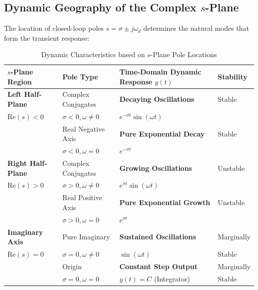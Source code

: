 \documentclass[12pt,onecolumn,twoside ]{article}
\begin{document}
	\subsection{Dynamic Geography of the Complex $s$-Plane}
	The location of closed-loop poles $s = \sigma \pm j\omega_d$ determines the natural modes that form the transient response:

\begin{table}[htbp]
	\centering
	\caption{Dynamic Characteristics based on $s$-Plane Pole Locations}
	\label{tab:s_plane_pole_responses}
	\small
	\renewcommand{\arraystretch}{1.3} %
	\begin{tabularx}{\textwidth}{L{1} L{1.0} L{1.4} L{0.6}}
		\toprule
		\textbf{$s$-Plane Region} & \textbf{Pole Type} & \textbf{Time-Domain Dynamic Response $y(t)$} & \textbf{Stability} \\
		\midrule
		\textbf{Left Half-Plane} & Complex Conjugates & \textbf{Decaying Oscillations} & Stable \\
		$\text{Re}(s) < 0$ & $\sigma < 0, \omega \neq 0$ & $e^{-\sigma t} \sin(\omega t)$ & \\
		\addlinespace[4pt]
		& Real Negative Axis & \textbf{Pure Exponential Decay} & Stable \\
		& $\sigma < 0, \omega = 0$ & $e^{-\sigma t}$ & \\
		\midrule
		\textbf{Right Half-Plane} & Complex Conjugates & \textbf{Growing Oscillations} & Unstable \\
		$\text{Re}(s) > 0$ & $\sigma > 0, \omega \neq 0$ & $e^{\sigma t} \sin(\omega t)$ & \\
		\addlinespace[4pt]
		& Real Positive Axis & \textbf{Pure Exponential Growth} & Unstable \\
		& $\sigma > 0, \omega = 0$ & $e^{\sigma t}$ & \\
		\midrule
		\textbf{Imaginary Axis} & Pure Imaginary & \textbf{Sustained Oscillations} & Marginally \\
		$\text{Re}(s) = 0$ & $\sigma = 0, \omega \neq 0$ & $\sin(\omega t)$ & Stable \\
		\addlinespace[4pt]
		& Origin & \textbf{Constant Step Output} & Marginally \\
		& $\sigma = 0, \omega = 0$ & $y(t) = C$ (Integrator) & Stable \\
		\bottomrule
	\end{tabularx}
\end{table}
\end{document}
